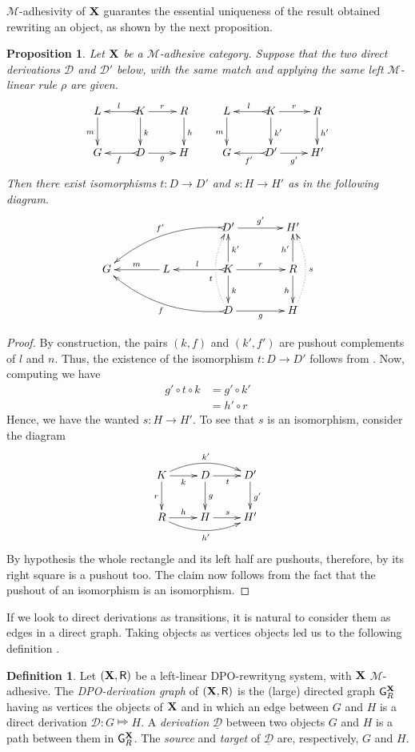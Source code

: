 \documentclass[a4paper]{article}
\def\R{\mathsf{R}}
\def\X{\textbf {\textup{X}}}
\newcommand{\dder}[1]{\mathscr{#1}}
\newcommand{\der}[1]{\underline{\dder{#1}}}
\def\gpo{\mathsf{G}^{\X}_R}
\newtheorem{proposition}[theorem]{Proposition}
\theoremstyle{definition}
\newtheorem{definition}[theorem]{Definition}
\begin{document}
$\mathcal{M}$-adhesivity of $\X$ guarantes the essential uniqueness of the result obtained rewriting an object, as shown by the next proposition.

\begin{proposition}\label{prop:unique} Let $\X$  be a $\mathcal{M}$-adhesive category. Suppose that the two direct derivations $\mathscr{D}$ and $\mathscr{D'}$ below, with the same match and applying the same left $\mathcal{M}$-linear rule $\rho$ are given.
	\[\xymatrix{L \ar[d]_{m}& K \ar[d]^{k}\ar@{>->}[l]_{l} \ar[r]^{r} & R \ar[d]^{h} & L \ar[d]_{m}& K \ar[d]^{k'}\ar@{>->}[l]_{l} \ar[r]^{r} & R \ar[d]^{h'}\\G & \ar@{>->}[l]^{f} D \ar[r]_{g}& H & G & \ar@{>->}[l]^{f'} D' \ar[r]_{g'}& H'}\]
Then there exist isomorphisms $t\colon D\to D'$ and $s\colon H\to H'$ as in the following diagram.
\[\xymatrix@C=40pt{&&D' \ar[r]^{g'} \ar@{>->}@/_.45cm/[dll]_{f'}&H'\\G & L \ar[l]_{m} & K \ar[u]_{k'} \ar[d]^{k}\ar[r]^{r} \ar@{>->}[l]_{l} &R\ar[u]^{h'} \ar[d]_{h}\\&&D\ar@{>->}@/^.45cm/[ull]^{f}\ar@/^.4cm/@{.>}[uu]^(.4){t}|\hole \ar[r]_{g}&H\ar@/_.4cm/@{.>}[uu]_{s}}\]
\end{proposition}
\begin{proof}
	By construction, the pairs $(k, f)$ and $(k', f')$ are pushout complements of $l$ and $n$. Thus, the existence of the isomorphism $t\colon D\to D'$ follows from . Now, computing we have
	\begin{align*}
		g'\circ t \circ k &= g' \circ k'\\&=h'\circ r
	\end{align*}
	Hence, we have the wanted $s\colon H\to H'$. To see that $s$ is an isomorphism, consider the diagram 
	\[\xymatrix{K  \ar@/^.4cm/[rr]^{k'}\ar[d]_{r} \ar[r]_{k}& \ar[r]_{t} D \ar[d]^{g}& D' \ar[d]^{g'}\\ R \ar@/_.4cm/[rr]_{h'} \ar[r]^{h}& H \ar[r]^{s}& H'}\]
	By hypothesis the whole rectangle and its left half are pushouts, therefore, by  its right square is a pushout too. The claim now follows from the fact that the pushout of an isomorphism is an isomorphism.
\end{proof}

If we look to direct derivations as transitions, it is natural to consider them as edges in a direct graph. Taking objects as vertices objects led us to the following definition \cite{heindel2009category}.

\begin{definition}
	Let $(\X, \R)$ be a left-linear DPO-rewrityng system, with $\X$ $\mathcal{M}$-adhesive. The \emph{DPO-derivation graph} of $(\X, \R)$ is the (large)  directed graph $\gpo$ having as vertices the objects of $\X$ and in which an edge between $G$ and $H$ is a direct derivation $\dder{D}\colon G\Mapsto H$.	A \emph{derivation} $\der{D}$ between two objects $G$ and $H$ is a path between them in $\gpo$. The \emph{source} and \emph{target} of $\der{D}$ are, respectively, $G$ and $H$.
\end{definition}
\end{document}
